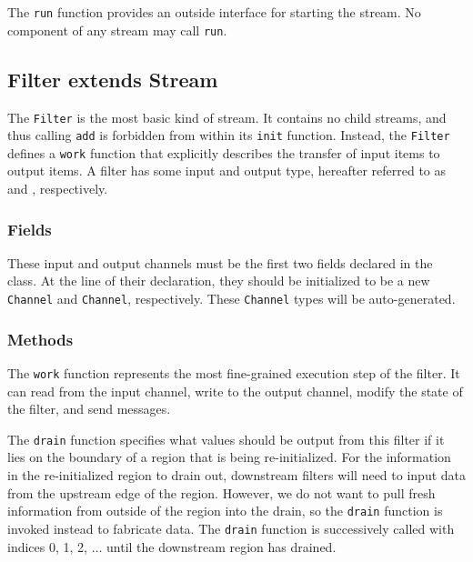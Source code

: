  The {\tt run} function provides an outside
interface for starting the stream.  No component of any stream may
call {\tt run}.

\subsection{Filter extends Stream}

The {\tt Filter} is the most basic kind of stream.  It contains no
child streams, and thus calling {\tt add} is forbidden from within its
{\tt init} function.  Instead, the {\tt Filter} defines a {\tt work}
function that explicitly describes the transfer of input items to
output items.  A filter has some input and output type, hereafter
referred to as {\tt <input-type>} and {\tt <output-type>},
respectively.

\subsubsection{Fields} 

 These input and output channels must be the first
two fields declared in the class.  At the line of their declaration,
they should be initialized to be a new {\tt <input-type>Channel} and
{\tt <output-type>Channel}, respectively.  These {\tt Channel} types
will be auto-generated.

\subsubsection{Methods}

  The {\tt work} function represents the most
fine-grained execution step of the filter.  It can read from the input
channel, write to the output channel, modify the state of the filter,
and send messages.

  The {\tt drain} function
specifies what values should be output from this filter if it lies on
the boundary of a region that is being re-initialized.  For the
information in the re-initialized region to drain out, downstream
filters will need to input data from the upstream edge of the region.
However, we do not want to pull fresh information from outside of the
region into the drain, so the {\tt drain} function is invoked instead
to fabricate data.  The {\tt drain} function is successively called
with indices 0, 1, 2, $\dots$ until the downstream region has drained.

